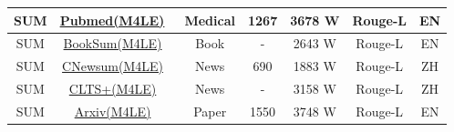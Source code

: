 \begin{table*}[]
\begin{tabular}{c|c|c|c|c|c|c}
SUM &
  \href{https://github.com/KwanWaiChung/M4LE}{Pubmed(M4LE)}~\cite{kwan_m4le:_2023} &
  Medical &
  1267 &
  3678 W &
  Rouge-L &
  EN \\ \hline
SUM &
  \href{https://github.com/KwanWaiChung/M4LE}{BookSum(M4LE)}~\cite{kwan_m4le:_2023} &
  Book &
  - &
  2643 W &
  Rouge-L &
  EN \\ \hline
SUM &
  \href{https://github.com/KwanWaiChung/M4LE}{CNewsum(M4LE)}~\cite{kwan_m4le:_2023} &
  News &
  690 &
  1883 W &
  Rouge-L &
  ZH \\ \hline
SUM &
  \href{https://github.com/KwanWaiChung/M4LE}{CLTS+(M4LE)}~\cite{kwan_m4le:_2023} &
  News &
  - &
  3158 W &
  Rouge-L &
  ZH \\ \hline
SUM &
  \href{https://github.com/KwanWaiChung/M4LE}{Arxiv(M4LE)}~\cite{kwan_m4le:_2023} &
  Paper&
  1550 &
  3748 W &
  Rouge-L &
  EN \\ \hline


 
\end{tabular}
\end{table*}

